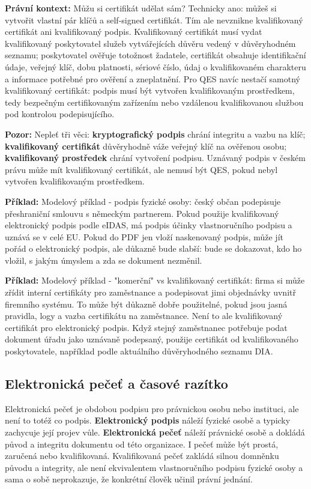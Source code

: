 \documentclass[11pt,a4paper]{article}
\newcommand{\pozor}[1]{\begin{tcolorbox}[breakable,enhanced,colback=red!7,colframe=red!30!black,boxrule=0pt,arc=1mm,left=5pt,right=5pt,top=5pt,bottom=5pt,before skip=6pt,after skip=6pt]\textbf{Pozor:} #1\end{tcolorbox}}
\newcommand{\priklad}[1]{\begin{tcolorbox}[breakable,enhanced,colback=green!7,colframe=green!30!black,boxrule=0pt,arc=1mm,left=5pt,right=5pt,top=5pt,bottom=5pt,before skip=6pt,after skip=6pt]\textbf{Příklad:} #1\end{tcolorbox}}
\newcommand{\pravobox}[1]{\begin{tcolorbox}[breakable,enhanced,colback=yellow!18,colframe=yellow!45!black,boxrule=0pt,arc=1mm,left=5pt,right=5pt,top=5pt,bottom=5pt,before skip=6pt,after skip=6pt]\textbf{Právní kontext:} #1\end{tcolorbox}}
\begin{document}
\pravobox{Můžu si certifikát udělat sám? Technicky ano: můžeš si vytvořit vlastní pár klíčů a self-signed certifikát. Tím ale nevznikne kvalifikovaný certifikát ani kvalifikovaný podpis. Kvalifikovaný certifikát musí vydat kvalifikovaný poskytovatel služeb vytvářejících důvěru vedený v důvěryhodném seznamu; poskytovatel ověřuje totožnost žadatele, certifikát obsahuje identifikační údaje, veřejný klíč, dobu platnosti, sériové číslo, údaj o kvalifikovaném charakteru a informace potřebné pro ověření a zneplatnění. Pro QES navíc nestačí samotný kvalifikovaný certifikát: podpis musí být vytvořen kvalifikovaným prostředkem, tedy bezpečným certifikovaným zařízením nebo vzdálenou kvalifikovanou službou pod kontrolou podepisujícího.}

\pozor{Nepleť tři věci: \textbf{kryptografický podpis} chrání integritu a vazbu na klíč; \textbf{kvalifikovaný certifikát} důvěryhodně váže veřejný klíč na ověřenou osobu; \textbf{kvalifikovaný prostředek} chrání vytvoření podpisu. Uznávaný podpis v českém právu může mít kvalifikovaný certifikát, ale nemusí být QES, pokud nebyl vytvořen kvalifikovaným prostředkem.}

\priklad{Modelový příklad - podpis fyzické osoby: český občan podepisuje přeshraniční smlouvu s německým partnerem. Pokud použije kvalifikovaný elektronický podpis podle eIDAS, má podpis účinky vlastnoručního podpisu a uznává se v celé EU. Pokud do PDF jen vloží naskenovaný podpis, může jít pořád o elektronický podpis, ale důkazně bude slabší: bude se dokazovat, kdo ho vložil, s jakým úmyslem a zda se dokument nezměnil.}

\priklad{Modelový příklad - "komerční" vs kvalifikovaný certifikát: firma si může zřídit interní certifikáty pro zaměstnance a podepisovat jimi objednávky uvnitř firemního systému. To může být důkazně dobře použitelné, pokud jsou jasná pravidla, logy a vazba certifikátu na zaměstnance. Není to ale kvalifikovaný certifikát pro elektronický podpis. Když stejný zaměstnanec potřebuje podat dokument úřadu jako uznávaně podepsaný, použije certifikát od kvalifikovaného poskytovatele, například podle aktuálního důvěryhodného seznamu DIA.}

\subsection*{Elektronická pečeť a časové razítko}
Elektronická pečeť je obdobou podpisu pro právnickou osobu nebo instituci, ale není to totéž co podpis. \textbf{Elektronický podpis} náleží fyzické osobě a typicky zachycuje její projev vůle. \textbf{Elektronická pečeť} náleží právnické osobě a dokládá původ a integritu dokumentu od této organizace. I pečeť může být prostá, zaručená nebo kvalifikovaná. Kvalifikovaná pečeť zakládá silnou domněnku původu a integrity, ale není ekvivalentem vlastnoručního podpisu fyzické osoby a sama o sobě neprokazuje, že konkrétní člověk učinil právní jednání.
\end{document}

